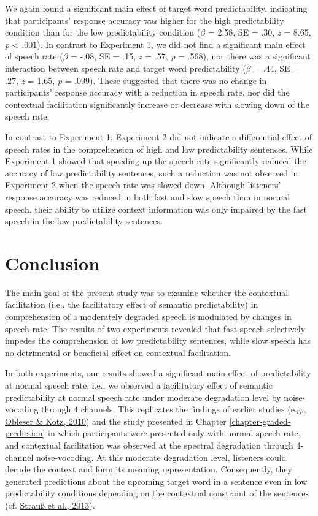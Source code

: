 \documentclass[a4paper, nobind]{templates/ociamthesis}
\begin{document}
We again found a significant main effect of target word predictability, indicating that participants' response accuracy was higher for the high predictability condition than for the low predictability condition (\(\beta\) = 2.58, SE = .30, \emph{z} = 8.65, \emph{p} \textless{} .001).
In contrast to Experiment 1, we did not find a significant main effect of speech rate (\(\beta\) = -.08, SE = .15, \emph{z} = .57, \emph{p} = .568),
nor there was a significant interaction between speech rate and target word predictability (\(\beta\) = .44, SE = .27, \emph{z} = 1.65, \emph{p} = .099).
These suggested that there was no change in participants' response accuracy with a reduction in speech rate,
nor did the contextual facilitation significantly increase or decrease with slowing down of the speech rate.

In contrast to Experiment 1, Experiment 2 did not indicate a differential effect of speech rates in the comprehension of high and low predictability sentences.
While Experiment 1 showed that speeding up the speech rate significantly reduced the accuracy of low predictability sentences, such a reduction was not observed in Experiment 2 when the speech rate was slowed down.
Although listeners' response accuracy was reduced in both fast and slow speech than in normal speech, their ability to utilize context information was only impaired by the fast speech in the low predictability sentences.

\hypertarget{conclusion-2}{%
\section{Conclusion}\label{conclusion-2}}

The main goal of the present study was to examine whether the contextual facilitation (i.e., the facilitatory effect of semantic predictability) in comprehension of a moderately degraded speech is modulated by changes in speech rate.
The results of two experiments revealed that fast speech selectively impedes the comprehension of low predictability sentences, while slow speech has no detrimental or beneficial effect on contextual facilitation.

In both experiments, our results showed a significant main effect of predictability at normal speech rate,
i.e., we observed a facilitatory effect of semantic predictability at normal speech rate under moderate degradation level by noise-vocoding through 4 channels.
This replicates the findings of earlier studies (e.g., \protect\hyperlink{ref-Obleser2010}{Obleser \& Kotz, 2010}) and the study presented in Chapter \ref{chapter-graded-prediction} in which participants were presented only with normal speech rate, and contextual facilitation was observed at the spectral degradation through 4-channel noise-vocoding.
At this moderate degradation level, listeners could decode the context and form its meaning representation.
Consequently, they generated predictions about the upcoming target word in a sentence even in low predictability conditions depending on the contextual constraint of the sentences (cf. \protect\hyperlink{ref-Strauss2013}{Strauß et al., 2013}).
\end{document}

